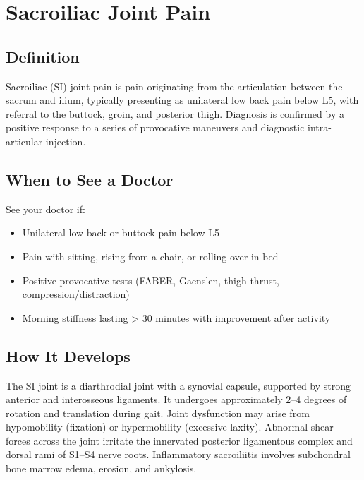 \chapter{Sacroiliac Joint Pain}

\section*{Definition}
Sacroiliac (SI) joint pain is pain originating from the articulation between the sacrum and ilium, typically presenting as unilateral low back pain below L5, with referral to the buttock, groin, and posterior thigh. Diagnosis is confirmed by a positive response to a series of provocative maneuvers and diagnostic intra-articular injection.

\section*{When to See a Doctor}
See your doctor if:
\begin{itemize}
  \item Unilateral low back or buttock pain below L5
  \item Pain with sitting, rising from a chair, or rolling over in bed
  \item Positive provocative tests (FABER, Gaenslen, thigh thrust, compression/distraction)
  \item Morning stiffness lasting > 30 minutes with improvement after activity
\end{itemize}

\section*{How It Develops}
The SI joint is a diarthrodial joint with a synovial capsule, supported by strong anterior and interosseous ligaments. It undergoes approximately 2--4 degrees of rotation and translation during gait. Joint dysfunction may arise from hypomobility (fixation) or hypermobility (excessive laxity). Abnormal shear forces across the joint irritate the innervated posterior ligamentous complex and dorsal rami of S1--S4 nerve roots. Inflammatory sacroiliitis involves subchondral bone marrow edema, erosion, and ankylosis.


